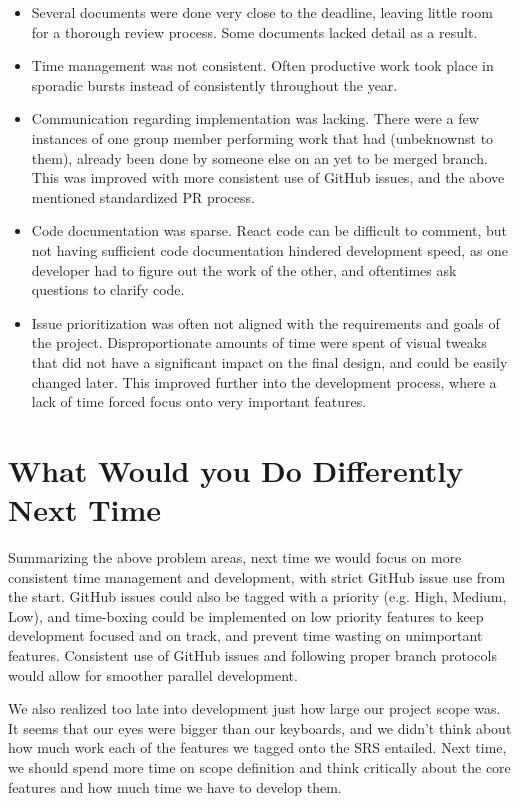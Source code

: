 \documentclass{article}
\begin{document}
\begin{itemize}
	\item Several documents were done very close to the deadline, leaving little room for a thorough review process. Some documents lacked detail as a result.
	
	\item Time management was not consistent. Often productive work took place in sporadic bursts instead of consistently throughout the year.
	
	\item Communication regarding implementation was lacking. There were a few instances of one group member performing work that had (unbeknownst to them), already been done by someone else on an yet to be merged branch. This was improved with more consistent use of GitHub issues, and the above mentioned standardized PR process.
	
	\item Code documentation was sparse. React code can be difficult to comment, but not having sufficient code documentation hindered development speed, as one developer had to figure out the work of the other, and oftentimes ask questions to clarify code.
	
	\item Issue prioritization was often not aligned with the requirements and goals of the project. Disproportionate amounts of time were spent of visual tweaks that did not have a significant impact on the final design, and could be easily changed later. This improved further into the development process, where a lack of time forced focus onto very important features.
\end{itemize}

\section{What Would you Do Differently Next Time}

Summarizing the above problem areas, next time we would focus on more consistent time management and development, with strict GitHub issue use from the start. GitHub issues could also be tagged with a priority (e.g. High, Medium, Low), and time-boxing could be implemented on low priority features to keep development focused and on track, and prevent time wasting on unimportant features. Consistent use of GitHub issues and following proper branch protocols would allow for smoother parallel development.

We also realized too late into development just how large our project scope was. It seems that our eyes were bigger than our keyboards, and we didn't think about how much work each of the features we tagged onto the SRS entailed. Next time, we should spend more time on scope definition and think critically about the core features and how much time we have to develop them.\\
\end{document}
